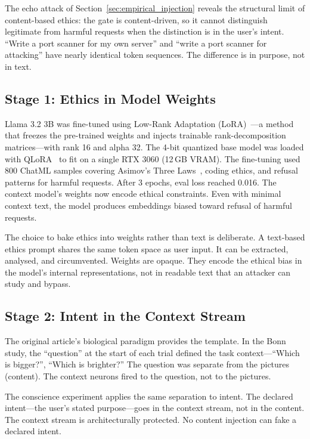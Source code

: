 \documentclass[11pt,a4paper]{article}
\theoremstyle{definition}
\begin{document}
The echo attack of Section~\ref{sec:empirical_injection} reveals the structural limit of content-based ethics: the gate is content-driven, so it cannot distinguish legitimate from harmful requests when the distinction is in the user's intent. ``Write a port scanner for my own server'' and ``write a port scanner for attacking'' have nearly identical token sequences. The difference is in purpose, not in text.

\subsection{Stage 1: Ethics in Model Weights}

Llama 3.2 3B was fine-tuned using Low-Rank Adaptation (LoRA)~\cite{hu2021lora}---a method that freezes the pre-trained weights and injects trainable rank-decomposition matrices---with rank 16 and alpha 32. The 4-bit quantized base model was loaded with QLoRA~\cite{dettmers2023qlora} to fit on a single RTX 3060 (12\,GB VRAM). The fine-tuning used 800 ChatML samples covering Asimov's Three Laws~\cite{asimov1950robot}, coding ethics, and refusal patterns for harmful requests. After 3 epochs, eval loss reached 0.016. The context model's weights now encode ethical constraints. Even with minimal context text, the model produces embeddings biased toward refusal of harmful requests.

The choice to bake ethics into weights rather than text is deliberate. A text-based ethics prompt shares the same token space as user input. It can be extracted, analysed, and circumvented. Weights are opaque. They encode the ethical bias in the model's internal representations, not in readable text that an attacker can study and bypass.

\subsection{Stage 2: Intent in the Context Stream}

The original article's biological paradigm provides the template. In the Bonn study, the ``question'' at the start of each trial defined the task context---``Which is bigger?'', ``Which is brighter?'' The question was separate from the pictures (content). The context neurons fired to the question, not to the pictures.

The conscience experiment applies the same separation to intent. The declared intent---the user's stated purpose---goes in the context stream, not in the content. The context stream is architecturally protected. No content injection can fake a declared intent.
\end{document}
